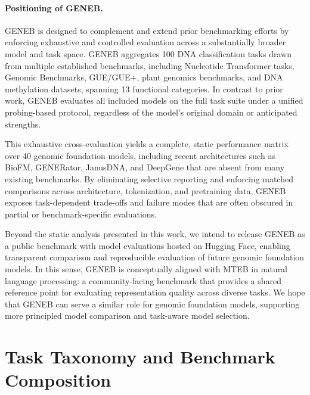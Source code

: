\documentclass{llmxive}
\begin{document}
\paragraph{Positioning of GENEB.}
GENEB is designed to complement and extend prior benchmarking efforts by enforcing exhaustive and controlled evaluation across a substantially broader model and task space. GENEB aggregates 100 DNA classification tasks drawn from multiple established benchmarks, including Nucleotide Transformer tasks, Genomic Benchmarks, GUE/GUE+, plant genomics benchmarks, and DNA methylation datasets, spanning 13 functional categories. In contrast to prior work, GENEB evaluates all included models on the full task suite under a unified probing-based protocol, regardless of the model’s original domain or anticipated strengths.

This exhaustive cross-evaluation yields a complete, static performance matrix over 40 genomic foundation models, including recent architectures such as BioFM, GENERator, JanusDNA, and DeepGene that are absent from many existing benchmarks. By eliminating selective reporting and enforcing matched comparisons across architecture, tokenization, and pretraining data, GENEB exposes task-dependent trade-offs and failure modes that are often obscured in partial or benchmark-specific evaluations.

Beyond the static analysis presented in this work, we intend to release GENEB as a public benchmark with model evaluations hosted on Hugging Face, enabling transparent comparison and reproducible evaluation of future genomic foundation models. In this sense, GENEB is conceptually aligned with MTEB \cite{muennighoff2023mtebmassivetextembedding} in natural language processing: a community-facing benchmark that provides a shared reference point for evaluating representation quality across diverse tasks. We hope that GENEB can serve a similar role for genomic foundation models, supporting more principled model comparison and task-aware model selection.

\section{Task Taxonomy and Benchmark Composition}
\label{subsec:task_taxonomy}
\end{document}
